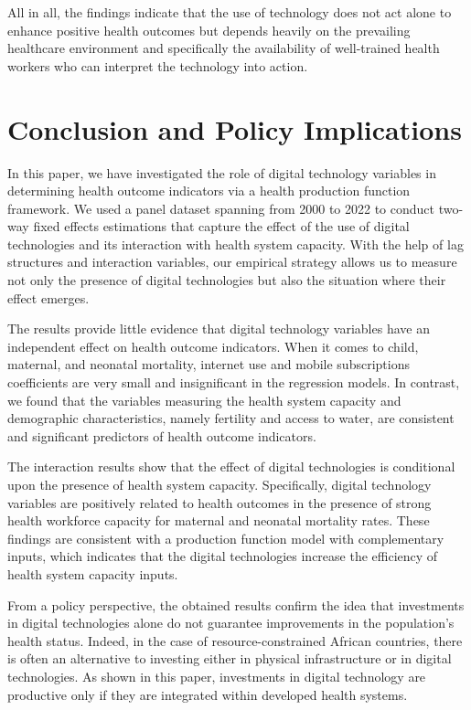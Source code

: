 \documentclass[12pt]{article}
\begin{document}
\medskip
All in all, the findings indicate that the use of technology does not act alone to enhance positive health outcomes but depends heavily on the prevailing healthcare environment and specifically the availability of well-trained health workers who can interpret the technology into action.


\section{Conclusion and Policy Implications}
In this paper, we have investigated the role of digital technology variables in determining health outcome indicators via a health production function framework. We used a panel dataset spanning from 2000 to 2022 to conduct two-way fixed effects estimations that capture the effect of the use of digital technologies and its interaction with health system capacity. With the help of lag structures and interaction variables, our empirical strategy allows us to measure not only the presence of digital technologies but also the situation where their effect emerges.

\medskip
The results provide little evidence that digital technology variables have an independent effect on health outcome indicators. When it comes to child, maternal, and neonatal mortality, internet use and mobile subscriptions coefficients are very small and insignificant in the regression models. In contrast, we found that the variables measuring the health system capacity and demographic characteristics, namely fertility and access to water, are consistent and significant predictors of health outcome indicators.

\medskip
The interaction results show that the effect of digital technologies is conditional upon the presence of health system capacity. Specifically, digital technology variables are positively related to health outcomes in the presence of strong health workforce capacity for maternal and neonatal mortality rates. These findings are consistent with a production function model with complementary inputs, which indicates that the digital technologies increase the efficiency of health system capacity inputs.

\medskip
From a policy perspective, the obtained results confirm the idea that investments in digital technologies alone do not guarantee improvements in the population's health status. Indeed, in the case of resource-constrained African countries, there is often an alternative to investing either in physical infrastructure or in digital technologies. As shown in this paper, investments in digital technology are productive only if they are integrated within developed health systems.
\end{document}
